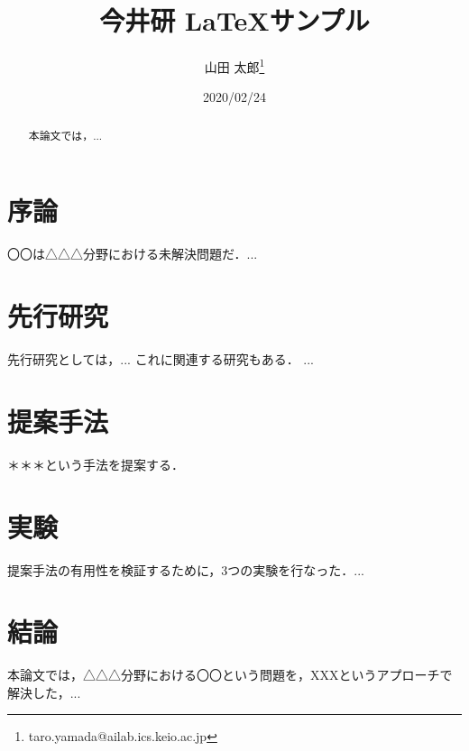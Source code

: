\documentclass[11pt,a4j]{jarticle}
\title{今井研 LaTeXサンプル}
\date{2020/02/24}
\author[1]{山田 太郎\thanks{taro.yamada@ailab.ics.keio.ac.jp}}
\affil[1]{慶應義塾大学理工学部情報工学科}
\begin{document}
  \maketitle
  
  \begin{abstract}
     本論文では，...
  \end{abstract}

  \section{序論}
    〇〇は△△△分野における未解決問題だ．...

  \section{先行研究}
    先行研究としては，... これに関連する研究もある．\cite{imai2003physical} ...

  \section{提案手法}
    ＊＊＊という手法を提案する．

  \section{実験}
    提案手法の有用性を検証するために，3つの実験を行なった．...

  \section{結論}
    本論文では，△△△分野における〇〇という問題を，XXXというアプローチで解決した，...

\end{document}
